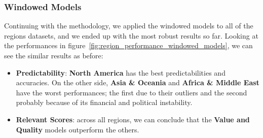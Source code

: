 \documentclass[11pt,english,a4paper,hidelinks]{book}
\begin{document}
\subsubsection{Windowed Models}
\noindent Continuing with the methodology, we applied the windowed models to all of the regions datasets, and we ended up with the most robust results so far. Looking at the performances in figure~\ref{fig:region_performance_windowed_models}, we can see the similar results as before:  

\begin{itemize}
    \item \textbf{Predictability}: \textbf{North America} has the best predictabilities and accuracies. On the other side,  \textbf{Asia \& Oceania} and \textbf{Africa \& Middle East} have the worst performances; the first due to their outliers and the second probably because of its financial and political instability.
    \item \textbf{Relevant Scores}: across all regions, we can conclude that the \textbf{Value and Quality} models outperform the others.
\end{itemize}
\end{document}
